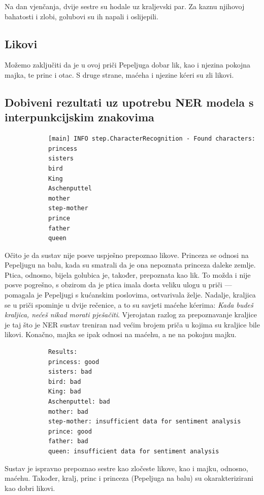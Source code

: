 \documentclass[a4paper,twoside,12pt]{memoir} %
\newcommand{\ti}[1]{\textit{#1\/}}
\begin{document}
		Na dan vjenčanja, dvije sestre su hodale uz kraljevski par. Za kaznu njihovoj bahatosti i zlobi, golubovi su ih napali i oslijepili.

		\subsection{Likovi}

		Možemo zaključiti da je u ovoj priči Pepeljuga dobar lik, kao i njezina pokojna majka, te princ i otac. S druge strane, maćeha i njezine kćeri su zli likovi.

		\subsection{Dobiveni rezultati uz upotrebu NER modela s interpunkcijskim znakovima}

		\begin{verbatim}
			[main] INFO step.CharacterRecognition - Found characters:
			princess
			sisters
			bird
			King
			Aschenputtel
			mother
			step-mother
			prince
			father
			queen
		\end{verbatim}

		Očito je da sustav nije posve uspješno prepoznao likove. Princeza se odnosi na Pepeljugu na balu, kada su smatrali da je ona nepoznata princeza daleke zemlje. Ptica, odnosno, bijela golubica je, također, prepoznata kao lik. To možda i nije posve pogrešno, s obzirom da je ptica imala dosta veliku ulogu u priči --- pomagala je Pepeljugi s kućanskim poslovima, ostvarivala želje. Nadalje, kraljica se u priči spominje u dvije rečenice, a to su savjeti maćehe kćerima: \ti{Kada budeš kraljica, nećeš nikad morati pješačiti}. Vjerojatan razlog za prepoznavanje kraljice je taj što je NER sustav treniran nad većim brojem priča u kojima su kraljice bile likovi. Konačno, majka se ipak odnosi na maćehu, a ne na pokojnu majku.

		\begin{verbatim}
			Results:
			princess: good
			sisters: bad
			bird: bad
			King: bad
			Aschenputtel: bad
			mother: bad
			step-mother: insufficient data for sentiment analysis
			prince: good
			father: bad
			queen: insufficient data for sentiment analysis
		\end{verbatim}

		Sustav je ispravno prepoznao sestre kao zločeste likove, kao i majku, odnosno, maćehu. Također, kralj, princ i princeza (Pepeljuga na balu) su okarakterizirani kao dobri likovi.
\end{document}
